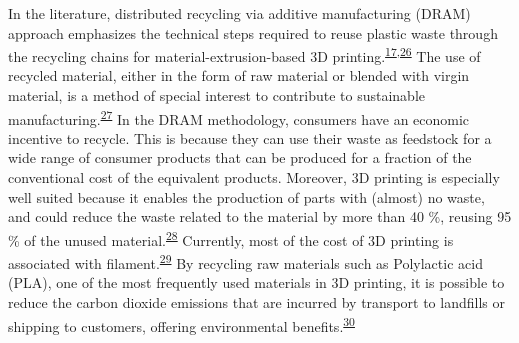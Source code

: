 \documentclass[
  12pt]{article}
\begin{document}
In the literature, distributed recycling via additive manufacturing (DRAM) approach emphasizes the technical steps required to reuse plastic waste through the recycling chains for material-extrusion-based 3D printing.\textsuperscript{\protect\hyperlink{ref-CruzSanchez2020}{17},\protect\hyperlink{ref-Little2020}{26}}
The use of recycled material, either in the form of raw material or blended with virgin material, is a method of special interest to contribute to sustainable manufacturing.\textsuperscript{\protect\hyperlink{ref-Zhao2018}{27}}
In the DRAM methodology, consumers have an economic incentive to recycle.
This is because they can use their waste as feedstock for a wide range of consumer products that can be produced for a fraction of the conventional cost of the equivalent products.
Moreover, 3D printing is especially well suited because it enables the production of parts with (almost) no waste, and could reduce the waste related to the material by more than 40 \%, reusing 95 \% of the unused material.\textsuperscript{\protect\hyperlink{ref-Petrovic2011}{28}}
Currently, most of the cost of 3D printing is associated with filament.\textsuperscript{\protect\hyperlink{ref-Wittbrodt2013}{29}}
By recycling raw materials such as Polylactic acid (PLA), one of the most frequently used materials in 3D printing, it is possible to reduce the carbon dioxide emissions that are incurred by transport to landfills or shipping to customers, offering environmental benefits.\textsuperscript{\protect\hyperlink{ref-Santander2020}{30}}
\end{document}
